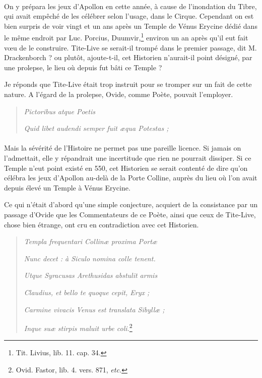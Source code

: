 \documentclass[a4paper, 18pt, oneside]{article}
\begin{document}
\paragraph{}
On y prépara les jeux d'Apollon en cette année, à cause de l'inondation du Tibre, qui avait empêché de les célébrer selon l'usage, dans le Cirque. Cependant on est bien surpris de voir vingt et un ans après un Temple de Vénus Erycine dédié dans le même endroit par Luc. Porcius, Duumvir,\footnote{Tit. Livius, lib. 11. cap. 34.} environ un an après qu'il eut fait vœu de le construire. Tite-Live se serait-il trompé dans le premier passage, dit M. Drackenborch ? ou plutôt, ajoute-t-il, cet Historien n'aurait-il point désigné, par une prolepse, le lieu où depuis fut bâti ce Temple ?

Je réponds que Tite-Live était trop instruit pour se tromper sur un fait de cette nature. A l'égard de la prolepse, Ovide, comme Poète, pouvait l'employer.
\begin{quotation}
\hspace*{10mm}\emph{Pictoribus atque Poetis}

\emph{Quid libet audendi semper fuit æqua Potestas ;}
\end{quotation}
\paragraph{}
Mais la sévérité de l'Histoire ne permet pas une pareille licence. Si jamais on l'admettait, elle y répandrait une incertitude que rien ne pourrait dissiper. Si ce Temple n'eut point existé en 550, cet Historien se serait contenté de dire qu'on célébra les jeux d'Apollon au-delà de la Porte Colline, auprès du lieu où l'on avait depuis élevé un Temple à Vénus Erycine.

Ce qui n'était d'abord qu'une simple conjecture, acquiert de la consistance par un passage d'Ovide que les Commentateurs de ce Poète, ainsi que ceux de Tite-Live, chose bien étrange, ont cru en contradiction avec cet Historien.
\begin{quotation}
\emph{Templa frequentari Collinæ proxima Portæ}

\hspace*{5mm}\emph{Nunc decet : à Siculo nomina colle tenent.}

\emph{Utque Syracusas Arethusidas abstulit armis}

\hspace*{5mm}\emph{Claudius, et bello te quoque cepit, Eryx ;}

\emph{Carmine vivacis Venus est translata Sibyllæ ;}

\hspace*{5mm}\emph{Inque suæ stirpis maluit urbe coli.}\footnote{Ovid. Fastor, lib. 4. vers. 871, \emph{etc.}}
\end{quotation}
\end{document}

